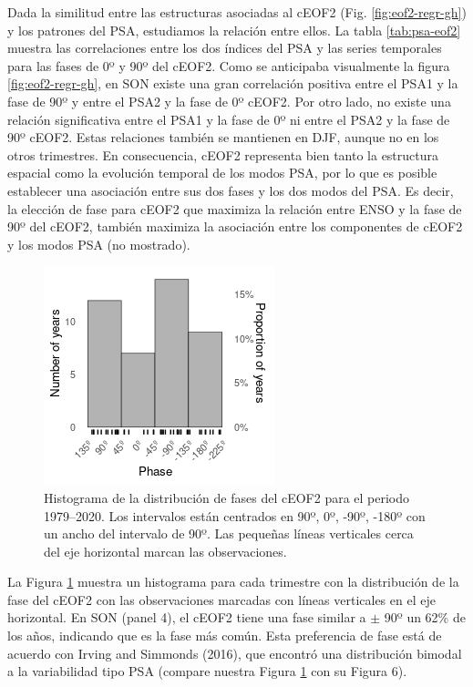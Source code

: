 \documentclass[12pt,oneside]{reedthesis}
\begin{document}
Dada la similitud entre las estructuras asociadas al cEOF2 (Fig. \ref{fig:eof2-regr-gh}) y los patrones del PSA, estudiamos la relación entre ellos.
La tabla \ref{tab:psa-eof2} muestra las correlaciones entre los dos índices del PSA y las series temporales para las fases de 0º y 90º del cEOF2.
Como se anticipaba visualmente la figura \ref{fig:eof2-regr-gh}, en SON existe una gran correlación positiva entre el PSA1 y la fase de 90º y entre el PSA2 y la fase de 0º cEOF2.
Por otro lado, no existe una relación significativa entre el PSA1 y la fase de 0º ni entre el PSA2 y la fase de 90º cEOF2.
Estas relaciones también se mantienen en DJF, aunque no en los otros trimestres.
En consecuencia, cEOF2 representa bien tanto la estructura espacial como la evolución temporal de los modos PSA, por lo que es posible establecer una asociación entre sus dos fases y los dos modos del PSA.
Es decir, la elección de fase para cEOF2 que maximiza la relación entre ENSO y la fase de 90º del cEOF2, también maximiza la asociación entre los componentes de cEOF2 y los modos PSA (no mostrado).





\begin{figure}
\includegraphics{figures/40-sam-ceof/phase-histogram-1} \caption{Histograma de la distribución de fases del cEOF2 para el periodo 1979--2020.
Los intervalos están centrados en 90º, 0º, -90º, -180º con un ancho del intervalo de 90º.
Las pequeñas líneas verticales cerca del eje horizontal marcan las observaciones.}\label{fig:phase-histogram}
\end{figure}

La Figura \ref{fig:phase-histogram} muestra un histograma para cada trimestre con la distribución de la fase del cEOF2 con las observaciones marcadas con líneas verticales en el eje horizontal.
En SON (panel 4), el cEOF2 tiene una fase similar a \(\pm\) 90º un 62\% de los años, indicando que es la fase más común.
Esta preferencia de fase está de acuerdo con Irving and Simmonds (2016), que encontró una distribución bimodal a la variabilidad tipo PSA (compare nuestra Figura \ref{fig:phase-histogram} con su Figura 6).
\end{document}
